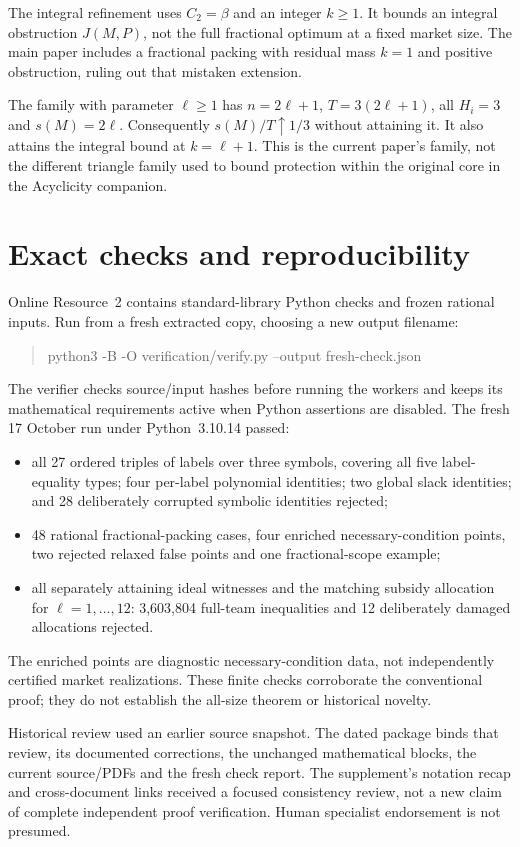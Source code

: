 \documentclass[11pt]{article}
\theoremstyle{remark}
\begin{document}
The integral refinement uses $C_2=\beta$ and an integer $k\ge1$. It bounds
an integral obstruction $J(M,P)$, not the full fractional optimum at a fixed
market size. The main paper includes a fractional packing with residual
mass $k=1$ and positive obstruction, ruling out that mistaken extension.

The family with parameter $\ell\ge1$ has $n=2\ell+1$, $T=3(2\ell+1)$,
all $H_i=3$ and $s(M)=2\ell$. Consequently $s(M)/T\uparrow1/3$ without
attaining it. It also attains the integral bound at $k=\ell+1$.
This is the current paper's family, not the different triangle family used
to bound protection within the original core in the Acyclicity companion.

\section{Exact checks and reproducibility}
Online Resource~2 contains standard-library Python checks and frozen rational
inputs. Run from a fresh extracted copy, choosing a new output filename:
\begin{quote}\small\ttfamily
python3 -B -O verification/verify.py --output fresh-check.json
\end{quote}
The verifier checks source/input hashes before running the workers and keeps
its mathematical requirements active when Python assertions are disabled.
The fresh 17 October run under Python~3.10.14 passed:
\begin{itemize}
\item all 27 ordered triples of labels over three symbols, covering all five
label-equality types; four per-label polynomial identities; two global slack
identities; and 28 deliberately corrupted symbolic identities rejected;
\item 48 rational fractional-packing cases, four enriched necessary-condition
points, two rejected relaxed false points and one fractional-scope example;
\item all separately attaining ideal witnesses and the matching subsidy
allocation for $\ell=1,\ldots,12$: 3,603,804 full-team inequalities and
12 deliberately damaged allocations rejected.
\end{itemize}
The enriched points are diagnostic necessary-condition data, not independently
certified market realizations. These finite checks corroborate the conventional
proof; they do not establish the all-size theorem or historical novelty.

Historical review used an earlier source snapshot. The dated package binds
that review, its documented corrections, the unchanged mathematical blocks,
the current source/PDFs and the fresh check report. The supplement's notation
recap and cross-document links received a focused consistency review, not a
new claim of complete independent proof verification. Human specialist endorsement is not presumed.
\end{document}
